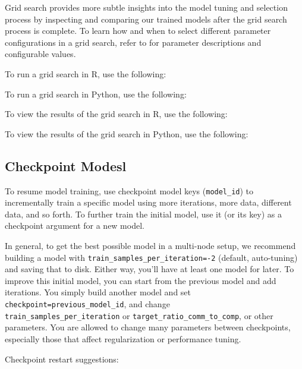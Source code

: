 {{Grid search provides more subtle insights into the model tuning and selection process by inspecting and comparing our trained models after the grid search process is complete. To learn how and when to select different parameter configurations in a grid search, refer to {\textbf{}} for parameter descriptions and configurable values. 

\waterExampleInR
To run a grid search in R, use the following:


\newpage
\waterExampleInPython
To run a grid search in Python, use the following:


\normalsize
\noindent
\waterExampleInR
To view the results of the grid search in R, use the following: 


\medskip
\waterExampleInPython
To view the results of the grid search in Python, use the following: 



\subsection{Checkpoint Modesl}

To resume model training, use checkpoint model keys (\texttt{model\_id}) to incrementally train a specific model using more iterations, more data, different data, and so forth. To further train the initial model, use it (or its key) as a checkpoint argument for a new model.

In general, to get the best possible model in a multi-node setup, we recommend building a model with \texttt{train\_samples\_per\_iteration=-2} (default, auto-tuning) and saving that to disk. Either way, you’ll have at least one model for later.
To improve this initial model, you can start from the previous model and add iterations. You simply build another model and set \texttt{checkpoint=previous\_model\_id}, and change \\\texttt{train\_samples\_per\_iteration} or \texttt{target\_ratio\_comm\_to\_comp},
or other parameters. You are allowed to change many parameters between checkpoints, especially those that affect regularization or performance tuning.

Checkpoint restart suggestions:

}}
